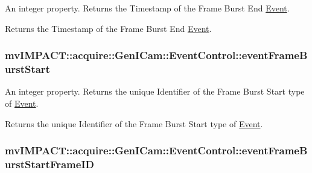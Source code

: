 An integer property. Returns the Timestamp of the Frame Burst End \hyperlink{classmv_i_m_p_a_c_t_1_1acquire_1_1_event}{Event}. 

Returns the Timestamp of the Frame Burst End \hyperlink{classmv_i_m_p_a_c_t_1_1acquire_1_1_event}{Event}. \hypertarget{classmv_i_m_p_a_c_t_1_1acquire_1_1_gen_i_cam_1_1_event_control_aeeda3c35dc059f2bbb55e49ba4b6657e}{
\subsubsection[{event\+Frame\+Burst\+Start}]{ mv\+I\+M\+P\+A\+C\+T\+::acquire\+::\+Gen\+I\+Cam\+::\+Event\+Control\+::event\+Frame\+Burst\+Start}}\label{classmv_i_m_p_a_c_t_1_1acquire_1_1_gen_i_cam_1_1_event_control_aeeda3c35dc059f2bbb55e49ba4b6657e}


An integer property. Returns the unique Identifier of the Frame Burst Start type of \hyperlink{classmv_i_m_p_a_c_t_1_1acquire_1_1_event}{Event}. 

Returns the unique Identifier of the Frame Burst Start type of \hyperlink{classmv_i_m_p_a_c_t_1_1acquire_1_1_event}{Event}. \hypertarget{classmv_i_m_p_a_c_t_1_1acquire_1_1_gen_i_cam_1_1_event_control_abf62c2851af7370c1943577fca87b331}{
\subsubsection[{event\+Frame\+Burst\+Start\+Frame\+I\+D}]{ mv\+I\+M\+P\+A\+C\+T\+::acquire\+::\+Gen\+I\+Cam\+::\+Event\+Control\+::event\+Frame\+Burst\+Start\+Frame\+I\+D}}\label{classmv_i_m_p_a_c_t_1_1acquire_1_1_gen_i_cam_1_1_event_control_abf62c2851af7370c1943577fca87b331}


